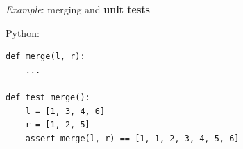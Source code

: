 \documentclass[14pt]{beamer}
\begin{document}
\begin{frame}[fragile]

  {\em Example}: merging and {\bf unit tests}

  \vspace{\baselineskip}
  \vspace{\baselineskip}

  \pause

  {\small Python:
  \begin{lstlisting}
def merge(l, r):
    ...

def test_merge():
    l = [1, 3, 4, 6]
    r = [1, 2, 5]
    assert merge(l, r) == [1, 1, 2, 3, 4, 5, 6]
  \end{lstlisting}}

\end{frame}


\end{document}
